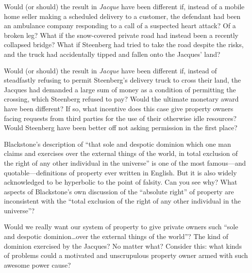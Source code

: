 
\item \label{jacque-hypos}Would (or should) the result in \textit{Jacque}
have been different if, instead of a mobile home seller making a scheduled
delivery to a customer, the defendant had been an ambulance company responding
to a call of a suspected heart attack? Of a broken leg? What if the
snow-covered private road had instead been a recently collapsed bridge? What if
Steenberg had tried to take the road despite the risks, and the truck had
accidentally tipped and fallen onto the Jacques' land?

\item \label{jacque-money-hypos}Would (or should) the result in \textit{Jacque}
have been different if, instead of steadfastly refusing to permit Steenberg's
delivery truck to cross their land, the Jacques had demanded a large sum of
money as a condition of permitting the crossing, which Steenberg refused to
pay? Would the ultimate monetary award have been different? If so, what
incentive does this case give property owners facing requests from third
parties for the use of their otherwise idle resources? Would Steenberg have
been better off not asking permission in the first place?

\item Blackstone's description of ``that sole and despotic dominion which one
man claims and exercises over the external things of the world, in total
exclusion of the right of any other individual in the universe'' is one of
the most famous---and quotable---definitions of property ever written in
English. But it is also widely acknowledged to be hyperbolic to the point of
falsity. Can you see why? What aspects of Blackstone's own discussion of the
``absolute right'' of property are inconsistent with the ``total exclusion of
the right of any other individual in the universe''?

\item Would we really want our system of property to give private owners such
``sole and despotic dominion\ldots over the external things of the world''? The
kind of dominion exercised by the Jacques? No matter what? Consider this: what
kinds of problems could a motivated and unscrupulous property owner armed with
such awesome power cause?



